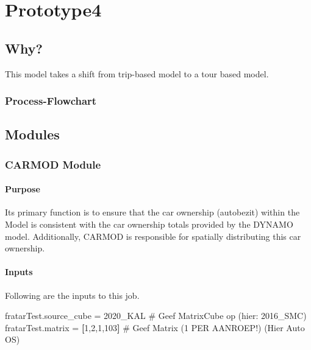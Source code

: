 \documentclass[
  letterpaper,
  DIV=11,
  numbers=noendperiod]{scrreprt}
\newenvironment{Shaded}{\begin{snugshade}}{\end{snugshade}}
\newcommand{\AttributeTok}[1]{\textcolor[rgb]{0.40,0.45,0.13}{#1}}
\newcommand{\CommentTok}[1]{\textcolor[rgb]{0.37,0.37,0.37}{#1}}
\newcommand{\DecValTok}[1]{\textcolor[rgb]{0.68,0.00,0.00}{#1}}
\newcommand{\KeywordTok}[1]{\textcolor[rgb]{0.00,0.23,0.31}{\textbf{#1}}}
\newcommand{\NormalTok}[1]{\textcolor[rgb]{0.00,0.23,0.31}{#1}}
\newcommand{\OperatorTok}[1]{\textcolor[rgb]{0.37,0.37,0.37}{#1}}
\newcommand{\VerbatimStringTok}[1]{\textcolor[rgb]{0.13,0.47,0.30}{#1}}
\begin{document}
\part{Prototype4}

\chapter*{Why?}\label{why}


This model takes a shift from trip-based model to a tour based model.

\section*{Process-Flowchart}\label{process-flowchart}


\chapter{Modules}\label{modules}

\section{CARMOD Module}\label{carmod-module}

\subsection{Purpose}

Its primary function is to ensure that the car ownership (autobezit)
within the Model is consistent with the car ownership totals provided by
the DYNAMO model. Additionally, CARMOD is responsible for spatially
distributing this car ownership.

\subsection{Inputs}

Following are the inputs to this job.

\begin{Shaded}
\begin{Highlighting}[]
\NormalTok{fratarTest}\AttributeTok{.source\_cube} \OperatorTok{=} \VerbatimStringTok{\textquotesingle{}2020\_KAL\textquotesingle{}} \CommentTok{\# Geef MatrixCube op (hier: 2016\_SMC)        }
\NormalTok{fratarTest}\AttributeTok{.matrix} \OperatorTok{=} \KeywordTok{[}\DecValTok{1}\NormalTok{,}\DecValTok{2}\NormalTok{,}\DecValTok{1}\NormalTok{,}\DecValTok{103}\KeywordTok{]}     \CommentTok{\# Geef Matrix (1 PER AANROEP!) (Hier Auto OS)}
\end{Highlighting}
\end{Shaded}
\end{document}
